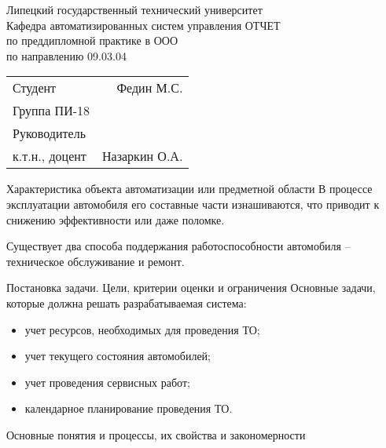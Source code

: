 \documentclass{beamer}
\begin{document}
\begin{frame}
    \begin{center}
        Липецкий государственный технический университет\\
        Кафедра автоматизированных систем управления
        \vfill
        ОТЧЕТ\\
        по преддипломной практике в ООО \\
        по направлению 09.03.04 \\
    \end{center}
    \vfill
    \begin{tabularx}{\textwidth}{LR}
        Студент & Федин М.С. \\
        Группа ПИ-18 & \\
        Руководитель & \\
        к.т.н., доцент & Назаркин О.А.
    \end{tabularx}
\end{frame}

\begin{frame}
	{Характеристика объекта автоматизации или предметной области}
    В процессе эксплуатации автомобиля его составные части изнашиваются, что
    приводит к снижению эффективности или даже поломке.

    Существует два способа поддержания работоспособности автомобиля --
    техническое обслуживание и ремонт.
\end{frame}

\begin{frame}
	{Постановка задачи. Цели, критерии оценки и ограничения}
Основные задачи, которые должна решать разрабатываемая система:
\begin{itemize}
	\item учет ресурсов, необходимых для проведения ТО;
	\item учет текущего состояния автомобилей;
	\item учет проведения сервисных работ;
	\item календарное планирование проведения ТО.
\end{itemize}
\end{frame}

\begin{frame}
	{Основные понятия и процессы, их свойства и закономерности}
\end{frame}
\end{document}
